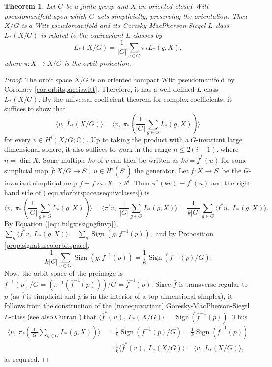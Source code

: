 \documentclass{amsart}
\newtheorem{thm}{Theorem}[section]
\theoremstyle{definition}
\theoremstyle{remark}
\newcommand {\cplx}  {\ensuremath{\mathbb{C}}}
\newcommand {\Sign}    {{\ensuremath{\operatorname{Sign}}}}
\begin{document}
\begin{thm} \label{thm.lclassorbitspace}
Let $G$ be a finite group and $X$ an oriented closed Witt pseudomanifold
upon which $G$ acts simplicially, preserving the orientation.
Then $X/G$ is a Witt pseudomanifold and its
Goresky-MacPherson-Siegel $L$-class $L_* (X/G)$ is related to the
equivariant $L$-classes by 
\begin{equation} \label{equ.lorbitspaceisaverage}
L_* (X/G) 
    = \frac{1}{|G|} \sum_{g\in G} \pi_* L_* (g,X), 
\end{equation}
where $\pi: X \to X/G$ is the orbit projection.
\end{thm}
\begin{proof}
The orbit space $X/G$ is an oriented compact Witt pseudomanifold by
Corollary \ref{cor.orbitspaceiswitt}. Therefore, it has a
well-defined $L$-class $L_* (X/G)$.
By the universal coefficient theorem for complex coefficients,
it suffices to show that
\begin{equation} \label{equ.vlorbitspaceasequivclasses}
\langle v,~ L_* (X/G) \rangle
    = \langle v,~ \pi_* \left( \frac{1}{|G|} \sum_{g\in G} L_* (g,X) 
      \right) \rangle 
\end{equation}      
for every $v\in H^i (X/G; \cplx)$.
Up to taking the product with a $G$-invariant large dimensional sphere,
it also suffices to work in the range $n \leq 2(i-1)$, where $n=\dim X$.
Some multiple $kv$ of $v$ can then be written as
$kv = \overline{f}^* (u)$ for some simplicial map 
$\overline{f}: X/G \to S^i,$ $u\in H^i (S^i)$ the generator. 
Let $f:X\to S^i$
be the $G$-invariant simplicial map $f=\overline{f} \circ \pi: X\to S^i$.
Then $\pi^* (kv) = f^* (u)$ and
the right hand side of (\ref{equ.vlorbitspaceasequivclasses}) is
\[
\langle v,~ \pi_* \left( \frac{1}{|G|} \sum_{g\in G} L_* (g,X) 
      \right) \rangle
 = \langle \pi^* v,~ \frac{1}{|G|} \sum_{g\in G} L_* (g,X) \rangle 
 = \frac{1}{k |G|} \sum_{g\in G}
  \langle  f^* u,~  L_* (g,X) \rangle.   
\]   
By Equation (\ref{equ.fulgxissigngfinvp}),
$\sum_{g}
  \langle  f^* u,~  L_* (g,X) \rangle
= \sum_{g}
   \Sign (g, f^{-1} (p)),$ and
by Proposition \ref{prop.signatureoforbitspace},
\[
\frac{1}{k |G|} \sum_{g\in G}
   \Sign (g, f^{-1} (p)) =
   \frac{1}{k} \Sign (f^{-1} (p) /G).
\]
Now, the orbit space of the preimage is
$f^{-1} (p) /G = (\pi^{-1} (\overline{f}^{-1} (p))) /G
  = \overline{f}^{-1} (p).$
Since $\overline{f}$ is transverse regular to $p$
(as $\overline{f}$ is simplicial and $p$ is in the interior of
a top dimensional simplex), it follows from the construction 
of the (nonequivariant) Goresky-MacPherson-Siegel $L$-class
(see also Curran \cite[p. 121f]{curran}) that
$\langle \overline{f}^* (u),~ L_* (X/G) \rangle
   = \Sign (\overline{f}^{-1} (p)).$
Thus
\begin{align*}
\langle v,~ \pi_* \left( \frac{1}{|G|} \sum_{g\in G} L_* (g,X) \right) \rangle
&= \frac{1}{k} \Sign (f^{-1} (p) /G) 
 = \frac{1}{k} \Sign (\overline{f}^{-1} (p)) \\
&= \frac{1}{k} \langle \overline{f}^* (u),~ L_* (X/G) \rangle 
 = \langle v,~ L_* (X/G) \rangle,
\end{align*}
as required.
\end{proof}
\end{document}
